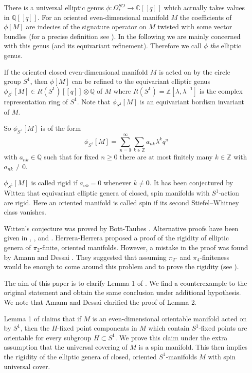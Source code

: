 \documentclass[a4paper, 11pt]{amsart}
\theoremstyle{definition}
\theoremstyle{remark}
\numberwithin{equation}{section}
\begin{document}
There is a universal elliptic genus \(\phi:\Omega^{SO}_*\rightarrow \mathbb{C}[[q]]\) which actually takes values in  \(\mathbb{Q}[[q]]\).
For an oriented even-dimensional manifold \(M\) the coefficients of \(\phi[M]\) are indecies of the signature operator on \(M\) twisted with some vector bundles (for a precise definition see \cite[Section 2]{MR954493}).
In the following we are mainly concerned with this genus (and its equivariant refinement).
Therefore we call \(\phi\) \emph{the} elliptic genus.

If the oriented closed even-dimensional manifold \(M\) is acted on by the circle group \(S^1\), then \(\phi[M]\) can be refined to the equivariant elliptic genus \(\phi_{S^1}[M]\in R(S^1)[[q]]\otimes \mathbb{Q}\) of \(M\) where \(R(S^1)=\mathbb{Z}[\lambda,\lambda^{-1}]\) is the complex representation ring of \(S^1\).
Note that \(\phi_{S^1}[M]\) is an equivariant bordism invariant of \(M\).

So \(\phi_{S^1}[M]\) is of the form
\[\phi_{S^1}[M]=\sum_{n=0}^\infty\sum_{k\in \mathbb{Z}} a_{nk} \lambda^k q^n\]
with \(a_{nk}\in \mathbb{Q}\) such that for fixed \(n\geq 0\) there are at most finitely many \(k\in \mathbb{Z}\) with \(a_{nk}\neq 0\).

\(\phi_{S^1}[M]\) is called rigid if \(a_{nk}=0\) whenever \(k\neq 0\).
It has been conjectured by Witten \cite{MR885560} that equivariant elliptic genera of closed, spin manifolds with \(S^1\)-action are rigid. Here an oriented manifold is called spin if its second Stiefel--Whitney class vanishes.

Witten's conjecture was proved by Bott-Taubes \cite{MR954493}.
Alternative proofs have been given in \cite{MR998662}, \cite{MR1331972}, \cite{MR1722036} and \cite{MR4146575}.
Herrera-Herrera \cite{MR1979364} proposed a proof of the rigidity of elliptic genera of \(\pi_2\)-finite, oriented manifolds.
However, a mistake in the proof was found by Amann and Dessai \cite{MR2600123}.
They suggested that assuming \(\pi_2\)- and \(\pi_4\)-finiteness would be enough to come around this problem and to prove the rigidity (see \cite{MR2916045}).

The aim of this paper is to clarify Lemma 1 of \cite{MR1979364}. We find a counterexample to the original statement and obtain the same conclusion under additional hypothesis. We note that Amann and Dessai clarified the proof of Lemma 2.

Lemma 1 of \cite{MR1979364} claims that if \(M\) is an even-dimensional orientable manifold acted on by \(S^1\), then the \(H\)-fixed point components in \(M\) which contain \(S^1\)-fixed points are orientable for every subgroup \(H\subset S^1\).
We prove this claim under the extra assumption that the universal covering of \(M\) is a spin manifold.
This then implies the rigidity of the elliptic genera of closed, oriented \(S^1\)-manifolds \(M\) with spin universal cover.
\end{document}
